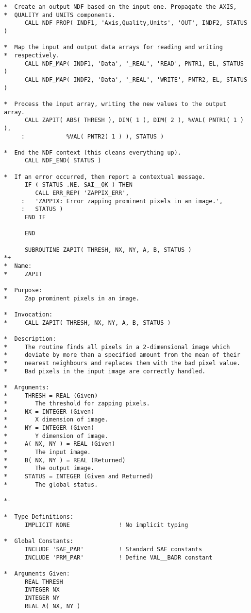 \begin{verbatim}
*  Create an output NDF based on the input one. Propagate the AXIS,
*  QUALITY and UNITS components.
      CALL NDF_PROP( INDF1, 'Axis,Quality,Units', 'OUT', INDF2, STATUS )

*  Map the input and output data arrays for reading and writing
*  respectively.
      CALL NDF_MAP( INDF1, 'Data', '_REAL', 'READ', PNTR1, EL, STATUS )
      CALL NDF_MAP( INDF2, 'Data', '_REAL', 'WRITE', PNTR2, EL, STATUS )
      
*  Process the input array, writing the new values to the output array.
      CALL ZAPIT( ABS( THRESH ), DIM( 1 ), DIM( 2 ), %VAL( PNTR1( 1 ) ),
     :            %VAL( PNTR2( 1 ) ), STATUS )

*  End the NDF context (this cleans everything up).
      CALL NDF_END( STATUS )

*  If an error occurred, then report a contextual message.
      IF ( STATUS .NE. SAI__OK ) THEN
         CALL ERR_REP( 'ZAPPIX_ERR',
     :   'ZAPPIX: Error zapping prominent pixels in an image.',
     :   STATUS )
      END IF

      END

      SUBROUTINE ZAPIT( THRESH, NX, NY, A, B, STATUS )
*+
*  Name:
*     ZAPIT

*  Purpose:
*     Zap prominent pixels in an image.

*  Invocation:
*     CALL ZAPIT( THRESH, NX, NY, A, B, STATUS )

*  Description:
*     The routine finds all pixels in a 2-dimensional image which
*     deviate by more than a specified amount from the mean of their
*     nearest neighbours and replaces them with the bad pixel value.
*     Bad pixels in the input image are correctly handled.

*  Arguments:
*     THRESH = REAL (Given)
*        The threshold for zapping pixels.
*     NX = INTEGER (Given)
*        X dimension of image.
*     NY = INTEGER (Given)
*        Y dimension of image.
*     A( NX, NY ) = REAL (Given)
*        The input image.
*     B( NX, NY ) = REAL (Returned)
*        The output image.
*     STATUS = INTEGER (Given and Returned)
*        The global status.

*-
      
*  Type Definitions:
      IMPLICIT NONE              ! No implicit typing

*  Global Constants:
      INCLUDE 'SAE_PAR'          ! Standard SAE constants
      INCLUDE 'PRM_PAR'          ! Define VAL__BADR constant

*  Arguments Given:
      REAL THRESH
      INTEGER NX
      INTEGER NY
      REAL A( NX, NY )


\end{verbatim}
